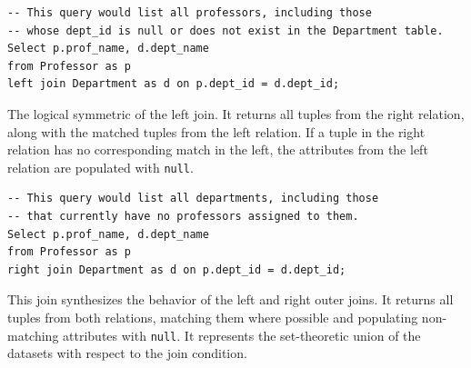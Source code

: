 \begin{description}
    \begin{center}
    \end{center}

    \begin{verbatim}
-- This query would list all professors, including those
-- whose dept_id is null or does not exist in the Department table.
Select p.prof_name, d.dept_name
from Professor as p
left join Department as d on p.dept_id = d.dept_id;
    \end{verbatim}

    \item[Right Outer Join (or Right Join)] The logical symmetric of the left join. It returns all tuples from the right relation, along with the matched tuples from the left relation. If a tuple in the right relation has no corresponding match in the left, the attributes from the left relation are populated with \texttt{null}.

    \begin{center}
    \end{center}

    \begin{verbatim}
-- This query would list all departments, including those
-- that currently have no professors assigned to them.
Select p.prof_name, d.dept_name
from Professor as p
right join Department as d on p.dept_id = d.dept_id;
    \end{verbatim}

    \item[Full Outer Join] This join synthesizes the behavior of the left and right outer joins. It returns all tuples from both relations, matching them where possible and populating non-matching attributes with \texttt{null}. It represents the set-theoretic union of the datasets with respect to the join condition.

    \begin{center}
    \end{center}
    

\end{description}
